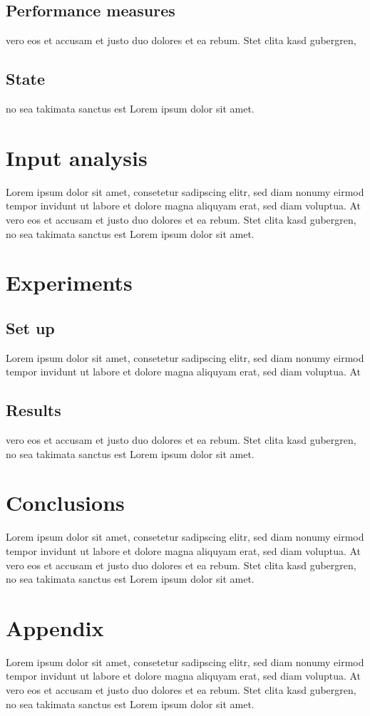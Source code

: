 \documentclass{article}
\begin{document}
        \subsection{Performance measures}
            vero eos et accusam et justo duo dolores et ea rebum. Stet clita kasd gubergren,
        \subsection{State}
            no sea takimata sanctus est Lorem ipsum dolor sit amet.
        
    

    \section{Input analysis}
        Lorem ipsum dolor sit amet, consetetur sadipscing elitr, sed diam nonumy eirmod
        tempor invidunt ut labore et dolore magna aliquyam erat, sed diam voluptua. At
        vero eos et accusam et justo duo dolores et ea rebum. Stet clita kasd gubergren,
        no sea takimata sanctus est Lorem ipsum dolor sit amet.


    \section{Experiments}
    \subsection{Set up}
        Lorem ipsum dolor sit amet, consetetur sadipscing elitr, sed diam nonumy eirmod
        tempor invidunt ut labore et dolore magna aliquyam erat, sed diam voluptua. At

    \subsection{Results}
        vero eos et accusam et justo duo dolores et ea rebum. Stet clita kasd gubergren,
        no sea takimata sanctus est Lorem ipsum dolor sit amet.
    
    
    \section{Conclusions}
        Lorem ipsum dolor sit amet, consetetur sadipscing elitr, sed diam nonumy eirmod
        tempor invidunt ut labore et dolore magna aliquyam erat, sed diam voluptua. At
        vero eos et accusam et justo duo dolores et ea rebum. Stet clita kasd gubergren,
        no sea takimata sanctus est Lorem ipsum dolor sit amet.
    

    \section{Appendix}
        Lorem ipsum dolor sit amet, consetetur sadipscing elitr, sed diam nonumy eirmod
        tempor invidunt ut labore et dolore magna aliquyam erat, sed diam voluptua. At
        vero eos et accusam et justo duo dolores et ea rebum. Stet clita kasd gubergren,
        no sea takimata sanctus est Lorem ipsum dolor sit amet.
    
\end{document}
